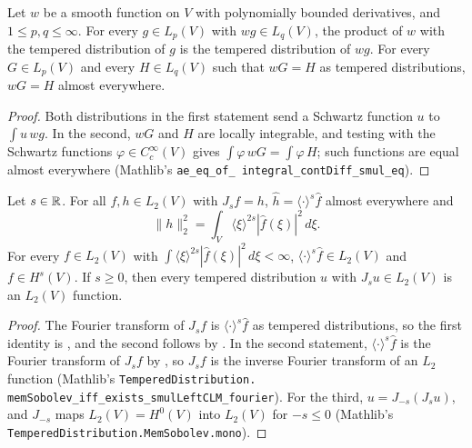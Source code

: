\begin{lemma}
\label{lem:temperate-weight-lp}
\leanok
Let $w$ be a smooth function on $V$ with polynomially bounded derivatives, and
$1 \leq p, q \leq \infty$. For every $g \in L_p(V)$ with $w g \in L_q(V)$, the product of $w$
with the tempered distribution of $g$ is the tempered distribution of $w g$. For every
$G \in L_p(V)$ and every $H \in L_q(V)$ such that $w G = H$ as tempered distributions,
$w G = H$ almost everywhere.
\end{lemma}

\begin{proof}
\leanok
Both distributions in the first statement send a Schwartz function $u$ to $\int u \, w g$. In
the second, $w G$ and $H$ are locally integrable, and testing with the Schwartz functions
$\varphi \in C^\infty_c(V)$ gives $\int \varphi \, w G = \int \varphi \, H$; such functions
are equal almost everywhere (Mathlib's \texttt{ae\_\allowbreak eq\_\allowbreak of\_\allowbreak
integral\_\allowbreak contDiff\_\allowbreak smul\_\allowbreak eq}).
\end{proof}

\begin{lemma}
\label{lem:bessel-potential-l2}
\leanok
{}
Let $s \in \mathbb{R}$. For all $f, h \in L_2(V)$ with $J_s f = h$, $\widehat h = \langle \cdot \rangle^s
\widehat f$ almost everywhere and
\[
  \|h\|_2^2 = \int_V \langle \xi \rangle^{2s} |\widehat f(\xi)|^2 \, d\xi .
\]
For every $f \in L_2(V)$ with $\int \langle \xi \rangle^{2s} |\widehat f(\xi)|^2 \, d\xi < \infty$,
$\langle \cdot \rangle^s \widehat f \in L_2(V)$ and $f \in H^s(V)$. If $s \geq 0$, then every
tempered distribution $u$ with $J_s u \in L_2(V)$ is an $L_2(V)$ function.
\end{lemma}

\begin{proof}
\leanok
The Fourier transform of $J_s f$ is $\langle \cdot \rangle^s \widehat f$ as tempered
distributions, so the first identity is , and the second follows by
. In the second statement, $\langle \cdot \rangle^s \widehat f$ is the
Fourier transform of $J_s f$ by , so $J_s f$ is the inverse Fourier
transform of an $L_2$ function (Mathlib's \texttt{TemperedDistribution.\allowbreak
memSobolev\_\allowbreak iff\_\allowbreak exists\_\allowbreak smulLeftCLM\_\allowbreak fourier}).
For the third, $u = J_{-s}(J_s u)$, and $J_{-s}$ maps $L_2(V) = H^0(V)$ into $L_2(V)$ for
$-s \leq 0$ (Mathlib's \texttt{TemperedDistribution.\allowbreak MemSobolev.\allowbreak mono}).
\end{proof}

